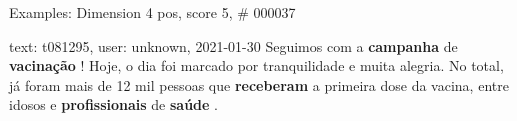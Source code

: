 \begin{frame}{Examples: Dimension 4 pos, score 5, \# 000037}
\footnotesize
\begin{exampleblock}{text: t081295, user: unknown, 2021-01-30}
Seguimos com a \textbf{campanha} de \textbf{vacinação} ! Hoje, o dia foi 
marcado por tranquilidade e muita alegria. No total, já foram mais de 12 mil 
pessoas que \textbf{receberam} a primeira dose da vacina, entre idosos e 
\textbf{profissionais} de \textbf{saúde} . 
\end{exampleblock}
\end{frame}
